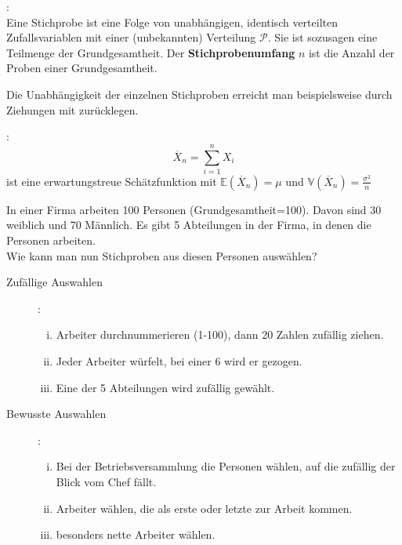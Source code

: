 \begin{definition}[Stichprobe:$(X_1,...,X_n)$]:\\
Eine Stichprobe ist eine Folge von unabhängigen, identisch verteilten Zufallsvariablen mit einer (unbekannten) Verteilung $\mathcal P$. Sie ist sozusagen eine Teilmenge der Grundgesamtheit.
Der \textbf{Stichprobenumfang} $n$ ist die Anzahl der Proben einer Grundgesamtheit.

Die Unabhängigkeit der einzelnen Stichproben erreicht man beispielsweise durch Ziehungen mit zurücklegen.
\end{definition}

\begin{definition}\label{def:stichprobenmittel}:\\
\[\overline X_n=\sum_{i=1}^n X_i\] ist eine erwartungstreue Schätzfunktion mit $\mathbb{E}(\overline X_n)=\mu$ und $\mathbb{V}(\overline X_n)=\frac{\sigma^2}{n}$
\end{definition}
\begin{bsp} In einer Firma arbeiten 100 Personen (Grundgesamtheit=100). Davon sind 30 weiblich und 70 Männlich. Es gibt 5 Abteilungen in der Firma, in denen die Personen arbeiten.\\
Wie kann man nun Stichproben aus diesen Personen auswählen?
\begin{description}
\item [Zufällige Auswahlen]:
\begin{enumerate}[i)]
    \item Arbeiter durchnummerieren (1-100), dann 20 Zahlen zufällig ziehen.
    \item Jeder Arbeiter würfelt, bei einer 6 wird er gezogen.
    \item Eine der 5 Abteilungen wird zufällig gewählt.
\end{enumerate}
\item[Bewusste Auswahlen]:
\begin{enumerate}[i)]
    \item Bei der Betriebsversammlung die Personen wählen, auf die zufällig der Blick vom Chef fällt.
    \item Arbeiter wählen, die als erste oder letzte zur Arbeit kommen.
    \item besonders nette Arbeiter wählen.
\end{enumerate}
\end{description}
\end{bsp}

